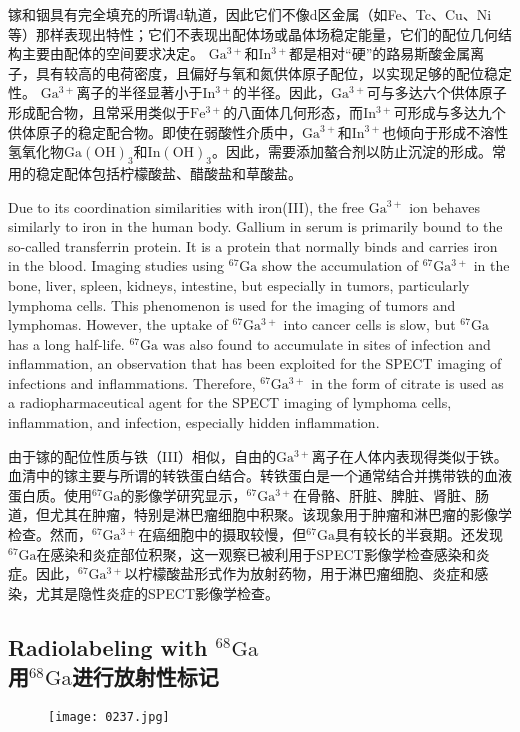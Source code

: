 \documentclass[dvipsnames, svgnames,a4paper,11pt]{article}
\begin{document}
镓和铟具有完全填充的所谓d轨道，因此它们不像d区金属（如Fe、Tc、Cu、Ni等）那样表现出特性；它们不表现出配体场或晶体场稳定能量，它们的配位几何结构主要由配体的空间要求决定。 \(\mathrm{Ga^{3+}}\)和\(\mathrm{In^{3+}}\)都是相对“硬”的路易斯酸金属离子，具有较高的电荷密度，且偏好与氧和氮供体原子配位，以实现足够的配位稳定性。 \(\mathrm{Ga^{3+}}\)离子的半径显著小于\(\mathrm{In^{3+}}\)的半径。因此，\(\mathrm{Ga^{3+}}\)可与多达六个供体原子形成配合物，且常采用类似于\(\mathrm{Fe^{3+}}\)的八面体几何形态，而\(\mathrm{In^{3+}}\)可形成与多达九个供体原子的稳定配合物。即使在弱酸性介质中，\(\mathrm{Ga^{3+}}\)和\(\mathrm{In^{3+}}\)也倾向于形成不溶性氢氧化物\(\mathrm{Ga(OH)_3}\)和\(\mathrm{In(OH)_3}\)。因此，需要添加螯合剂以防止沉淀的形成。常用的稳定配体包括柠檬酸盐、醋酸盐和草酸盐。

Due to its coordination similarities with iron(III), the free \(\mathrm{Ga^{3+}}\) ion behaves similarly to iron in the human body. Gallium in serum is primarily bound to the so-called transferrin protein. It is a protein that normally binds and carries iron in the blood. Imaging studies using \(\mathrm{^{67}Ga}\) show the accumulation of \(\mathrm{^{67}Ga^{3+}}\) in the bone, liver, spleen, kidneys, intestine, but especially in tumors, particularly lymphoma cells. This phenomenon is used for the imaging of tumors and lymphomas. However, the uptake of \(\mathrm{^{67}Ga^{3+}}\) into cancer cells is slow, but \(\mathrm{^{67}Ga}\) has a long half-life. \(\mathrm{^{67}Ga}\) was also found to accumulate in sites of infection and inflammation, an observation that has been exploited for the SPECT imaging of infections and inflammations. Therefore, \(\mathrm{^{67}Ga^{3+}}\) in the form of citrate is used as a radiopharmaceutical agent for the SPECT imaging of lymphoma cells, inflammation, and infection, especially hidden inflammation.

由于镓的配位性质与铁（III）相似，自由的\(\mathrm{Ga^{3+}}\)离子在人体内表现得类似于铁。血清中的镓主要与所谓的转铁蛋白结合。转铁蛋白是一个通常结合并携带铁的血液蛋白质。使用\(\mathrm{^{67}Ga}\)的影像学研究显示，\(\mathrm{^{67}Ga^{3+}}\)在骨骼、肝脏、脾脏、肾脏、肠道，但尤其在肿瘤，特别是淋巴瘤细胞中积聚。该现象用于肿瘤和淋巴瘤的影像学检查。然而，\(\mathrm{^{67}Ga^{3+}}\)在癌细胞中的摄取较慢，但\(\mathrm{^{67}Ga}\)具有较长的半衰期。还发现\(\mathrm{^{67}Ga}\)在感染和炎症部位积聚，这一观察已被利用于SPECT影像学检查感染和炎症。因此，\(\mathrm{^{67}Ga^{3+}}\)以柠檬酸盐形式作为放射药物，用于淋巴瘤细胞、炎症和感染，尤其是隐性炎症的SPECT影像学检查。

\subsection{Radiolabeling with \(\mathrm{^{68}Ga}\)\\ 用\(\mathrm{^{68}Ga}\)进行放射性标记}  
\begin{figure}[h]
	\centering
    \texttt{[image: 0237.jpg]}  
     \label{fig315}
\end{figure}
\end{document}
